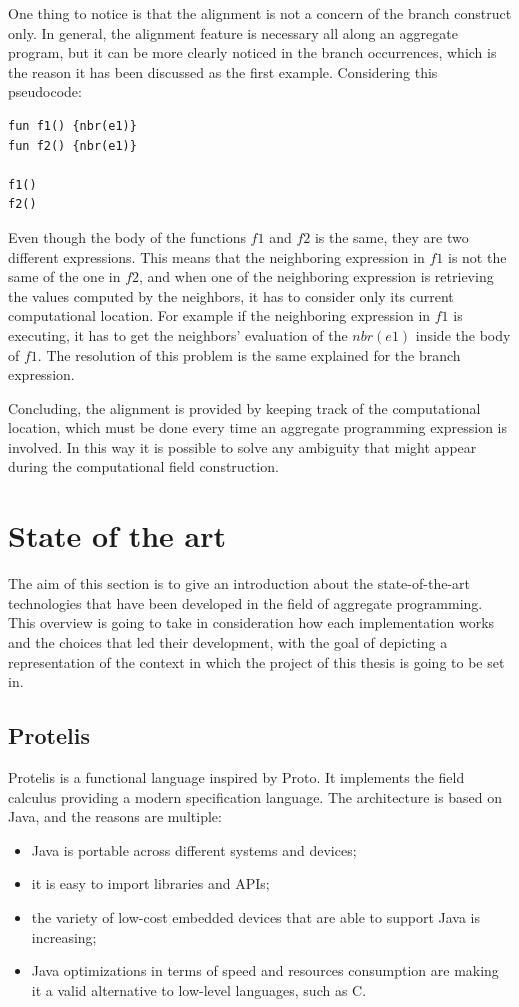 One thing to notice is that the alignment is not a concern of the branch construct only. In general, the alignment feature is necessary all along an aggregate program, but it can be more clearly noticed in the branch occurrences, which is the reason it has been discussed as the first example.\newline
Considering this pseudocode:
\begin{lstlisting}
fun f1() {nbr(e1)}
fun f2() {nbr(e1)}

f1()
f2()
\end{lstlisting}
Even though the body of the functions $f1$ and $f2$ is the same, they are two different expressions. This means that the neighboring expression in $f1$ is not the same of the one in $f2$, and when one of the neighboring expression is retrieving the values computed by the neighbors, it has to consider only its current computational location. For example if the neighboring expression in $f1$ is executing, it has to get the neighbors' evaluation of the $nbr(e1)$ inside the body of $f1$. The resolution of this problem is the same explained for the branch expression.

Concluding, the alignment is provided by keeping track of the computational location, which must be done every time an aggregate programming expression is involved. In this way it is possible to solve any ambiguity that might appear during the computational field construction.

\section{State of the art}
The aim of this section is to give an introduction about the state-of-the-art technologies that have been developed in the field of aggregate programming. This overview is going to take in consideration how each implementation works and the choices that led their development, with the goal of depicting a representation of the context in which the project of this thesis is going to be set in.

\subsection{Protelis}\label{subsection:protelis}
Protelis \cite{protelis_introduction} is a functional language inspired by Proto. It implements the field calculus providing a modern specification language.\newline
The architecture is based on Java, and the reasons are multiple:
\begin{itemize}
    \item Java is portable across different systems and devices;
    \item it is easy to import libraries and APIs;
    \item the variety of low-cost embedded devices that are able to support Java is increasing;
    \item Java optimizations in terms of speed and resources consumption are making it a valid alternative to low-level languages, such as C.
\end{itemize}

